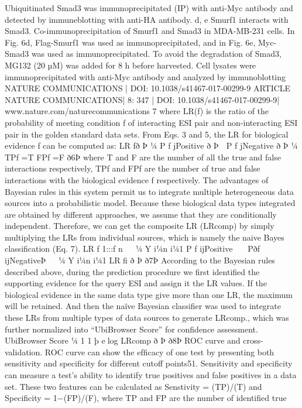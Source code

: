 Ubiquitinated Smad3 was immunoprecipitated (IP) with anti-Myc antibody and detected by immuneblotting with anti-HA antibody. d, e Smurf1 interacts
with Smad3. Co-immunoprecipitation of Smurf1 and Smad3 in MDA-MB-231 cells. In Fig. 6d, Flag-Smurf1 was used as immunoprecipitated, and in Fig. 6e,
Myc-Smad3 was used as immunoprecipitated. To avoid the degradation of Smad3, MG132 (20 µM) was added for 8 h before harvested. Cell lysates were
immunoprecipitated with anti-Myc antibody and analyzed by immunoblotting
NATURE COMMUNICATIONS | DOI: 10.1038/s41467-017-00299-9
ARTICLE
NATURE COMMUNICATIONS| 8:  347
| DOI: 10.1038/s41467-017-00299-9| www.nature.com/naturecommunications
7
where LR(f) is the ratio of the probability of meeting condition f of interacting ESI
pair and non-interacting ESI pair in the golden standard data sets. From Eqs. 3 and
5, the LR for biological evidence f can be computed as:
LR fð Þ ¼ P f jPositive
ð
Þ  P f jNegative
ð
Þ ¼ TPf =T
FPf =F
ð6Þ
where T and F are the number of all the true and false interactions respectively, TPf
and FPf are the number of true and false interactions with the biological evidence f
respectively. The advantages of Bayesian rules in this system permit us to integrate
multiple heterogeneous data sources into a probabilistic model. Because these
biological data types integrated are obtained by different approaches, we assume
that they are conditionally independent. Therefore, we can get the composite LR
(LRcomp) by simply multiplying the LRs from individual sources, which is namely
the naive Bayes classiﬁcation (Eq. 7).
LR f 1:::f n


¼
Y
i¼n
i¼1
P f ijPositive


 Pðf ijNegativeÞ


¼
Y
i¼n
i¼1
LR fi
ð Þ
ð7Þ
According to the Bayesian rules described above, during the prediction
procedure we ﬁrst identiﬁed the supporting evidence for the query ESI and assign it
the LR values. If the biological evidence in the same data type give more than one
LR, the maximum will be retained. And then the naïve Bayesian classiﬁer was used
to integrate these LRs from multiple types of data sources to generate LRcomp.,
which was further normalized into “UbiBrowser Score” for conﬁdence assessment.
UbiBrowser Score ¼
1
1 þ elog LRcomp
ð
Þ
ð8Þ
ROC curve and cross-validation. ROC curve can show the efﬁcacy of one test by
presenting both sensitivity and speciﬁcity for different cutoff points51. Sensitivity
and speciﬁcity can measure a test’s ability to identify true positives and false
positives in a data set. These two features can be calculated as Senstivity = (TP)/(T)
and Speciﬁcity = 1−(FP)/(F), where TP and FP are the number of identiﬁed true
